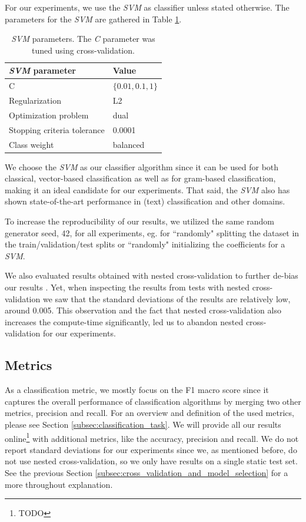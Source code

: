 For our experiments, we use the \textit{SVM}\cite{Cortes1995} as classifier unless stated otherwise.
The parameters for the \textit{SVM} are gathered in Table \ref{table:svm_parameters}.

\begin{table}[htb!]
	\centering
	\begin{tabular}{ll}
		\textit{SVM} parameter & Value  \\
		\toprule
		C & $\{0.01, 0.1, 1\}$ \\
		Regularization & L2 \\
		Optimization problem & dual \\
		Stopping criteria tolerance & 0.0001 \\
		Class weight & balanced \\
		\bottomrule
	\end{tabular}
	\caption[Table: SVM parameters]{\textit{SVM} parameters. The \textit{C} parameter was tuned using cross-validation.}%
	\label{table:svm_parameters}
\end{table}

We choose the \textit{SVM} as our classifier algorithm since it can be used for both classical, vector-based classification as well as for gram-based classification, making it an ideal candidate for our experiments.
That said, the \textit{SVM} also has shown state-of-the-art performance in (text) classification and other domains.

To increase the reproducibility of our results, we utilized the same random generator seed, 42, for all experiments, eg. for ``randomly" splitting the dataset in the train/validation/test splits or ``randomly" initializing the coefficients for a \textit{SVM}.

We also evaluated results obtained with nested cross-validation to further de-bias our results \cite{Varma2006}. Yet, when inspecting the results from tests with nested cross-validation we saw that the standard deviations of the results are relatively low, around 0.005.
This observation and the fact that nested cross-validation also increases the compute-time significantly, led us to abandon nested cross-validation for our experiments.


\subsection{Metrics}
As a classification metric, we mostly focus on the F1 macro score since it captures the overall performance of classification algorithms by merging two other metrics, precision and recall.
For an overview and definition of the used metrics, please see Section \ref{subsec:classification_task}.
We will provide all our results online\footnote{TODO} with additional metrics, like the accuracy, precision and recall.
We do not report standard deviations for our experiments since we, as mentioned before, do not use nested cross-validation, so we only have results on a single static test set.
See the previous Section \ref{subsec:cross_validation_and_model_selection} for a more throughout explanation.

